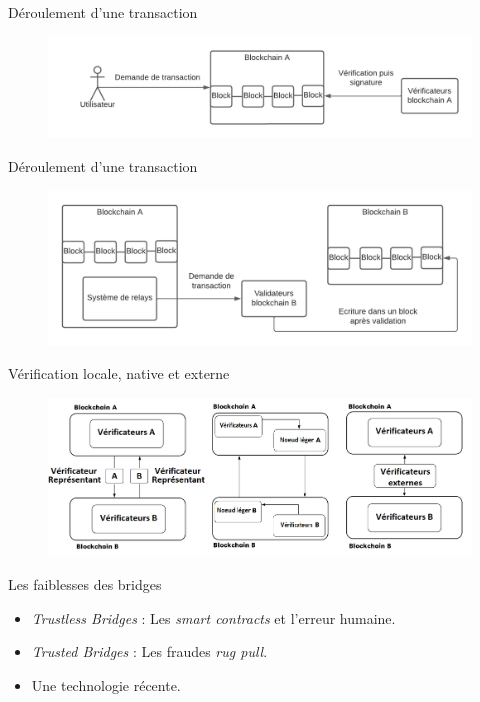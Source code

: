 \begin{frame}{Déroulement d'une transaction}
    \begin{figure}
        \includegraphics[scale = 0.65]{centralisation/img_bridges/Transaction2.png}
    \end{figure}
\end{frame}

\begin{frame}{Déroulement d'une transaction}
    \begin{figure}
        \centering
        \includegraphics[scale = 0.65]{centralisation/img_bridges/Transaction3.png}
    \end{figure}
\end{frame}

\begin{frame}{Vérification locale, native et externe}
    \begin{figure}
        \centering
        \includegraphics[scale = 0.4]{centralisation/img_bridges/DiagrammeResumeVerif.png}
    \end{figure}
\end{frame}

    
\begin{frame}{Les faiblesses des bridges}
    \begin{itemize}
        \item \textit{Trustless Bridges} : Les \textit{smart contracts} et l'erreur humaine.
        \item \textit{Trusted Bridges} : Les fraudes \textit{rug pull}.
        \item Une technologie récente.
    \end{itemize}
    \end{frame}

